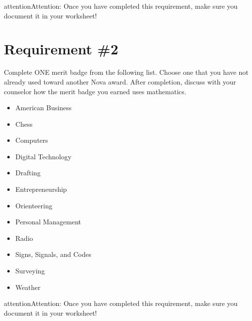 \documentclass[letterpaper,10pt,english]{sphinxmanual}
\begin{document}
\begin{sphinxadmonition}{attention}{Attention:}
Once you have completed this requirement, make sure you document it in your worksheet!
\end{sphinxadmonition}


\chapter{Requirement \#2}
\label{\detokenize{requirement2:requirement-2}}\label{\detokenize{requirement2::doc}}
Complete ONE merit badge from the following list. Choose one that you have not already used toward another Nova award.
After completion, discuss with your counselor how the merit badge you earned uses mathematics.
\begin{itemize}
\item {} 
American Business

\item {} 
Chess

\item {} 
Computers

\item {} 
Digital Technology

\item {} 
Drafting

\item {} 
Entrepreneurship

\item {} 
Orienteering

\item {} 
Personal Management

\item {} 
Radio

\item {} 
Signs, Signals, and Codes

\item {} 
Surveying

\item {} 
Weather

\end{itemize}

\begin{sphinxadmonition}{attention}{Attention:}
Once you have completed this requirement, make sure you document it in your worksheet!
\end{sphinxadmonition}
\end{document}

